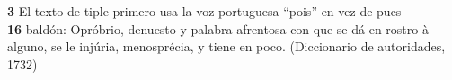 \noindent \textbf{3} El texto de tiple primero usa la voz portuguesa ``pois'' en vez de pues\\
\textbf{16} baldón: Opróbrio, denuesto y palabra afrentosa con que se dá en rostro à alguno, se le injúria, menosprécia, y tiene en poco. (Diccionario de autoridades, 1732)

